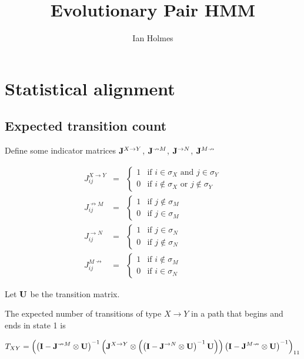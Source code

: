 \documentclass{article}
\title{Evolutionary Pair HMM}
\author{Ian Holmes}
\begin{document}

\section{Statistical alignment}

\subsection{Expected transition count}

Define some indicator matrices
${\bf J}^{X \to Y}$,
${\bf J}^{\nrightarrow M}$,
${\bf J}^{\rightarrow N}$,
${\bf J}^{M \nrightarrow}$

\begin{eqnarray*}
  J^{X \to Y}_{ij} & = & \left\{ \begin{array}{ll} 1 & \mbox{if $i \in \sigma_X$ and $j \in \sigma_Y$} \\ 0 & \mbox{if $i \notin \sigma_X$ or $j \notin \sigma_Y$} \end{array} \right. \\
  J^{\nrightarrow M}_{ij} & = & \left\{ \begin{array}{ll} 1 & \mbox{if $j \notin \sigma_M$} \\ 0 & \mbox{if $j \in \sigma_M$} \end{array} \right. \\
  J^{\rightarrow N}_{ij} & = & \left\{ \begin{array}{ll} 1 & \mbox{if $j \in \sigma_N$} \\ 0 & \mbox{if $j \notin \sigma_N$} \end{array} \right. \\
  J^{M \nrightarrow}_{ij} & = & \left\{ \begin{array}{ll} 1 & \mbox{if $i \notin \sigma_M$} \\ 0 & \mbox{if $i \in \sigma_N$} \end{array} \right.
\end{eqnarray*}

Let ${\bf U}$ be the transition matrix.

The expected number of transitions of type $X \to Y$
in a path that begins and ends in state 1
is

\[
T_{XY} =
\left(
\left( {\bf I} - {\bf J}^{\nrightarrow M} \otimes {\bf U} \right)^{-1}
\left(
     {\bf J}^{X \to Y} \otimes
     \left(
     \left( {\bf I} - {\bf J}^{\rightarrow N} \otimes {\bf U} \right)^{-1}
          {\bf U}
     \right)
\right)
\left( {\bf I} - {\bf J}^{M \nrightarrow} \otimes {\bf U} \right)^{-1}
\right)_{11}
\]
\end{document}
